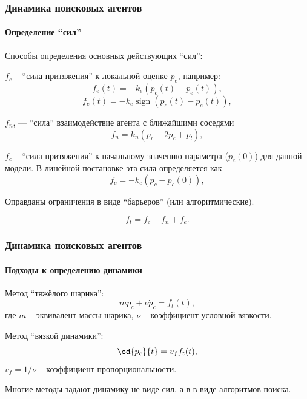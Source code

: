 \documentclass[10pt,utf8]{beamer}
\DeclareMathOperator*{\sign}{sign}
\begin{document}
\begin{frame}
  \frametitle{Динамика поисковых агентов}
  \framesubtitle{Определение ``сил''}

  Способы определения основных действующих ``сил'':

$f_e$ -- ``сила притяжения'' к локальной оценке $p_e$, например:
%
\begin{equation}
  f_e(t) = - k_e ( p_c(t) - p_e(t) ) ,
  \label{atu:eq:f_e_lin}
\end{equation}
%
\begin{equation}
  f_e(t) = - k_e \sign( p_c(t) - p_e(t) ) ,
  \label{atu:eq:f_e_sign}
\end{equation}

$f_n$, --- ''сила'' взаимодействие агента с ближайшими соседями
%
\begin{equation}
  f_n = k_n ( p_r - 2 p_c + p_l ),
  \label{atu:eq:f_n_lin}
\end{equation}

$f_c$  -- ``сила притяжения'' к начальному значению
параметра ($p_{c}(0)$)
для данной модели. В линейной постановке эта сила определяется как
%
\begin{equation}
  f_c = -k_c (p_c - p_{c}(0)) ,
  \label{atu:eq:f_c}
\end{equation}

  Оправданы ограничения в виде ``барьеров'' (или алгоритмические).

  \begin{equation}
  f_t = f_c + f_n + f_e .
  \label{atu:eq:f_t}
\end{equation}

\end{frame}



\begin{frame}
  \frametitle{Динамика поисковых агентов}
  \framesubtitle{Подходы к определению динамики}

Метод ``тяжёлого шарика'':
%
\begin{equation}
  m \ddot{p}_c + \nu \dot{p}_c = f_t(t),
  \label{atu:eq:heavy_ball}
\end{equation}
%
где $m$ -- эквивалент массы шарика,
$\nu$ -- коэффициент условной вязкости.

Метод ``вязкой динамики'':
%
  \begin{equation}
  \od{p_c}{t} = v_f f_t(t),
  \label{atu:eq:v_f}
\end{equation}
%
\noindent
$v_f = 1/\nu$ -- коэффициент пропорциональности.

\smallskip

Многие методы задают динамику не виде сил,
а в в виде алгоритмов поиска.


\end{frame}
\end{document}
